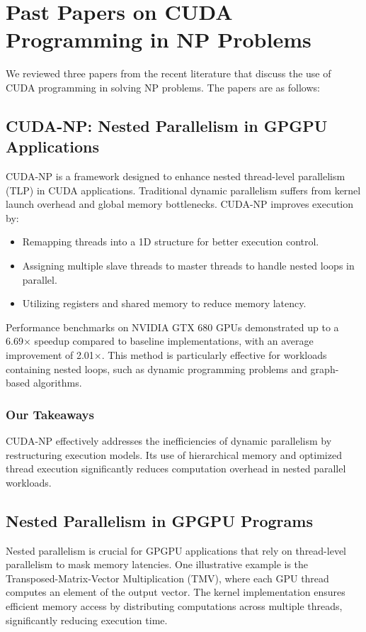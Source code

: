 \documentclass[12pt]{article}
\begin{document}
\section{Past Papers on CUDA Programming in NP Problems}

We reviewed three papers from the recent literature that discuss the use of CUDA programming in solving NP problems. The papers are as follows:

\subsection{CUDA-NP: Nested Parallelism in GPGPU Applications}
CUDA-NP is a framework designed to enhance nested thread-level parallelism (TLP) in CUDA applications. Traditional dynamic parallelism suffers from kernel launch overhead and global memory bottlenecks. CUDA-NP improves execution by:
\begin{itemize}
    \item Remapping threads into a 1D structure for better execution control.
    \item Assigning multiple slave threads to master threads to handle nested loops in parallel.
    \item Utilizing registers and shared memory to reduce memory latency.
\end{itemize}

Performance benchmarks on NVIDIA GTX 680 GPUs demonstrated up to a 6.69× speedup compared to baseline implementations, with an average improvement of 2.01×. This method is particularly effective for workloads containing nested loops, such as dynamic programming problems and graph-based algorithms.

\subsubsection{Our Takeaways}
CUDA-NP effectively addresses the inefficiencies of dynamic parallelism by restructuring execution models. Its use of hierarchical memory and optimized thread execution significantly reduces computation overhead in nested parallel workloads.

\subsection{Nested Parallelism in GPGPU Programs}

Nested parallelism is crucial for GPGPU applications that rely on thread-level parallelism to mask memory latencies. One illustrative example is the Transposed-Matrix-Vector Multiplication (TMV), where each GPU thread computes an element of the output vector. The kernel implementation ensures efficient memory access by distributing computations across multiple threads, significantly reducing execution time.
\end{document}
